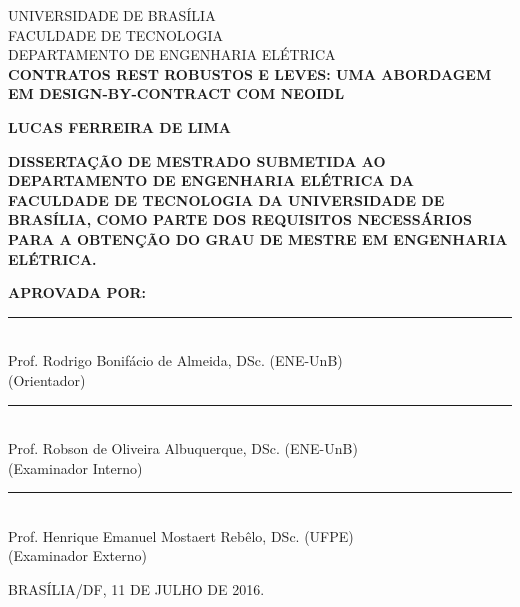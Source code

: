 \begin{bf}
\begin{center}
{\normalsize UNIVERSIDADE DE BRASÍLIA}\\
{\normalsize FACULDADE DE TECNOLOGIA}\\
{\normalsize DEPARTAMENTO DE ENGENHARIA ELÉTRICA}\\

\vspace{10mm}
{\large {\bf  CONTRATOS REST ROBUSTOS E LEVES: UMA ABORDAGEM EM
DESIGN-BY-CONTRACT COM NEOIDL }}

\vspace{10mm}
{\large {\bf LUCAS FERREIRA DE LIMA}}
\end{center}
\end{bf}

\vspace{10mm}

\noindent\MakeUppercase{ {\bf
Dissertação de Mestrado submetida ao
Departamento de Engenharia Elétrica
da Faculdade de Tecnologia da Universidade de Brasília,
como parte dos requisitos necessários para a obtenção do grau de mestre em
ENGENHARIA ELÉTRICA. }}

\vspace{5mm}

\noindent\MakeUppercase{ {\bf Aprovada por:}}

\vspace{10mm}

\begin{bf}
\noindent\rule{120mm}{0.1mm}\\
{ Prof. Rodrigo Bonifácio de Almeida, DSc. (ENE-UnB) }\\
{(Orientador)}

\vspace{7.5mm}

\noindent\rule{120mm}{0.1mm}\\
{ Prof. Robson de Oliveira Albuquerque, DSc.
(ENE-UnB) }\\
{(Examinador Interno)}

\vspace{7.5mm}

\noindent\rule{120mm}{0.1mm}\\
{  Prof. Henrique Emanuel Mostaert Rebêlo, DSc. (UFPE) }\\
{(Examinador Externo)}

\vspace{7.5mm}

\vspace{7.5mm}
\noindent\MakeUppercase{Brasília/DF, 11 DE JULHO DE 2016.}
\end{bf}

\pagebreak



